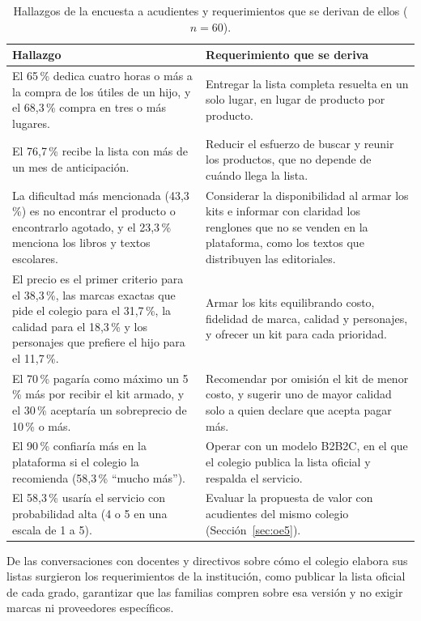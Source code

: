 \begin{table}[!htb]
\centering\footnotesize
\setlength{\tabcolsep}{4pt}
\renewcommand{\arraystretch}{1.25}
\caption{Hallazgos de la encuesta a acudientes y requerimientos que se derivan de ellos
($n=60$).}
\label{tab:encuesta-requerimientos}
\begin{tabularx}{\textwidth}{@{}XX@{}}
\toprule
\textbf{Hallazgo} & \textbf{Requerimiento que se deriva} \\
\midrule
El 65\,\% dedica cuatro horas o más a la compra de los útiles de un hijo, y el 68,3\,\%
compra en tres o más lugares. &
Entregar la lista completa resuelta en un solo lugar, en lugar de producto por producto. \\
El 76,7\,\% recibe la lista con más de un mes de anticipación. &
Reducir el esfuerzo de buscar y reunir los productos, que no depende de cuándo llega la lista. \\
La dificultad más mencionada (43,3\,\%) es no encontrar el producto o encontrarlo agotado, y
el 23,3\,\% menciona los libros y textos escolares. &
Considerar la disponibilidad al armar los kits e informar con claridad los renglones que no
se venden en la plataforma, como los textos que distribuyen las editoriales. \\
El precio es el primer criterio para el 38,3\,\%, las marcas exactas que pide el colegio
para el 31,7\,\%, la calidad para el 18,3\,\% y los personajes que prefiere el hijo para el
11,7\,\%. &
Armar los kits equilibrando costo, fidelidad de marca, calidad y personajes, y ofrecer un
kit para cada prioridad. \\
El 70\,\% pagaría como máximo un 5\,\% más por recibir el kit armado, y el 30\,\% aceptaría
un sobreprecio de 10\,\% o más. &
Recomendar por omisión el kit de menor costo, y sugerir uno de mayor calidad solo a quien
declare que acepta pagar más. \\
El 90\,\% confiaría más en la plataforma si el colegio la recomienda (58,3\,\% ``mucho
más''). &
Operar con un modelo B2B2C, en el que el colegio publica la lista oficial y respalda el
servicio. \\
El 58,3\,\% usaría el servicio con probabilidad alta (4 o 5 en una escala de 1 a 5). &
Evaluar la propuesta de valor con acudientes del mismo colegio (Sección~\ref{sec:oe5}). \\
\bottomrule
\end{tabularx}
\end{table}

De las conversaciones con docentes y directivos sobre cómo el colegio
elabora sus listas surgieron los requerimientos de la
institución, como publicar la lista oficial de cada grado, garantizar que las familias
compren sobre esa versión y no exigir marcas ni proveedores específicos.\par

